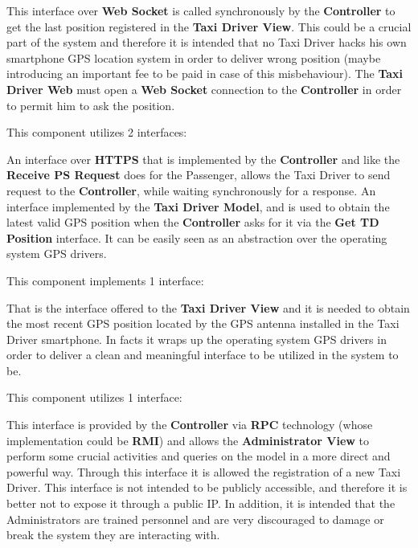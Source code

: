 \begin{itemize}
\begin{itemize}
		 This interface over \textbf{Web Socket} is called synchronously by the \textbf{Controller} to get the last position registered in the \textbf{Taxi Driver View}.
		This could be a crucial part of the system and therefore it is intended that no Taxi Driver hacks his own smartphone GPS location system in order to deliver wrong position (maybe introducing an important fee to be paid in case of this misbehaviour).
		The \textbf{Taxi Driver Web} must open a \textbf{Web Socket} connection to the \textbf{Controller} in order to permit him to ask the position.
	\end{itemize}
	This component utilizes 2 interfaces:
	\begin{itemize}
		 An interface over \textbf{HTTPS} that is implemented by the \textbf{Controller} and like the \textbf{Receive PS Request} does for the Passenger, allows the Taxi Driver to send request to the \textbf{Controller}, while waiting synchronously for a response.
		 An interface implemented by the \textbf{Taxi Driver Model}, and is used to obtain the latest valid GPS position when the \textbf{Controller} asks for it via the \textbf{Get TD Position} interface.
		It can be easily seen as an abstraction over the operating system GPS drivers.
	\end{itemize}
	\itemBold{Taxi Driver Model}
	This component implements 1 interface:
	\begin{itemize}
		 That is the interface offered to the \textbf{Taxi Driver View} and it is needed to obtain the most recent GPS position located by the GPS antenna installed in the Taxi Driver smartphone.
		In facts it wraps up the operating system GPS drivers in order to deliver a clean and meaningful interface to be utilized in the system to be.
	\end{itemize}
	\itemBold{Administration View}
	This component utilizes 1 interface:
	\begin{itemize}
		 This interface is provided by the \textbf{Controller} via \textbf{RPC} technology (whose implementation could be \textbf{RMI}) and allows the \textbf{Administrator View} to perform some crucial activities and queries on the \myTaxiService{} model in a more direct and powerful way. Through this interface it is allowed the registration of a new Taxi Driver.
		This interface is not intended to be publicly accessible, and therefore it is better not to expose it through a public IP.
		In addition, it is intended that the Administrators are trained personnel and are very discouraged to damage or break the system they are interacting with.

\end{itemize}
\end{itemize}
